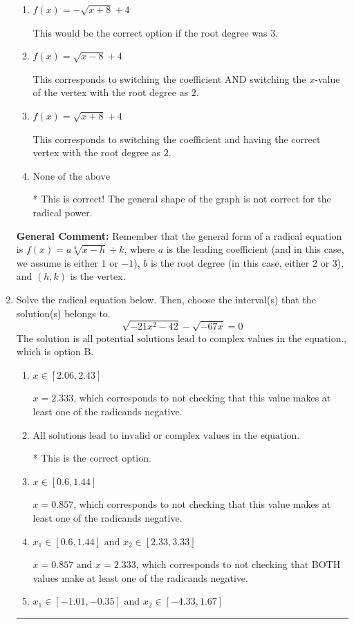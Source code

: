 \documentclass{extbook}[14pt]
\newcommand{\litem}[1]{\item #1

\rule{\textwidth}{0.4pt}}
\begin{document}
\begin{enumerate}
{\begin{enumerate}[label=\Alph*.]
This corresponds to the correct coefficient and switching the $x$-value of the vertex with the root degree as $2$.
\item \( f(x) = - \sqrt{x + 8} + 4 \)

This would be the correct option if the root degree was $3$.
\item \( f(x) = \sqrt{x - 8} + 4 \)

This corresponds to switching the coefficient AND switching the $x$-value of the vertex with the root degree as $2$.
\item \( f(x) = \sqrt{x + 8} + 4 \)

This corresponds to switching the coefficient and having the correct vertex with the root degree as $2$.
\item \( \text{None of the above} \)

* This is correct! The general shape of the graph is not correct for the radical power.
\end{enumerate}

\textbf{General Comment:} Remember that the general form of a radical equation is $ f(x) = a \sqrt[b]{x - h} + k$, where $a$ is the leading coefficient (and in this case, we assume is either $1$ or $-1$), $b$ is the root degree (in this case, either $2$ or $3$), and $(h, k)$ is the vertex.
}
\litem{
Solve the radical equation below. Then, choose the interval(s) that the solution(s) belongs to.
\[ \sqrt{-21 x^2 - 42} - \sqrt{-67 x} = 0 \]
The solution is \( \text{all potential solutions lead to complex values in the equation.} \), which is option B.\begin{enumerate}[label=\Alph*.]
\item \( x \in [2.06,2.43] \)

$x = 2.333$, which corresponds to not checking that this value makes at least one of the radicands negative.
\item \( \text{All solutions lead to invalid or complex values in the equation.} \)

* This is the correct option.
\item \( x \in [0.6,1.44] \)

$x = 0.857$, which corresponds to not checking that this value makes at least one of the radicands negative.
\item \( x_1 \in [0.6, 1.44] \text{ and } x_2 \in [2.33,3.33] \)

$x = 0.857 \text{ and } x = 2.333$, which corresponds to not checking that BOTH values make at least one of the radicands negative.
\item \( x_1 \in [-1.01, -0.35] \text{ and } x_2 \in [-4.33,1.67] \)


\end{enumerate}}
\end{enumerate}
\end{document}
